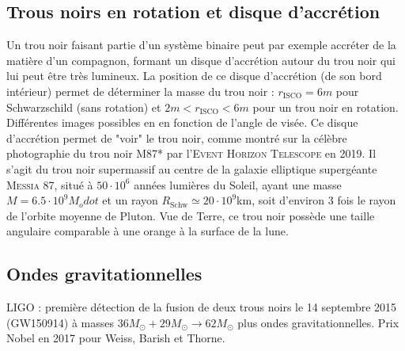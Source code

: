 \subsection{Trous noirs en rotation et disque d'accrétion}
Un trou noir faisant partie d'un système binaire peut par exemple accréter de la matière d'un compagnon, formant un disque d'accrétion autour du trou noir qui lui peut être très lumineux. La position de ce disque d'accrétion (de son bord intérieur) permet de déterminer la masse du trou noir : $r_\text{ISCO} = 6m$ pour Schwarzschild (sans rotation) et $2m<r_\text{ISCO}<6m$ pour un trou noir en rotation. \\
Différentes images possibles en en fonction de l'angle de visée. Ce disque d'accrétion permet de "voir" le trou noir, comme montré sur la célèbre photographie du trou noir \textsc{M87*} par l'\textsc{Event Horizon Telescope} en 2019. Il s'agit du trou noir supermassif au centre de la galaxie elliptique supergéante \textsc{Messia 87}, situé à $50 \cdot 10^6$ années lumières du Soleil, ayant une masse $M = 6.5 \cdot 10^9 M_odot$ et un rayon $R_\text{Schw} \simeq 20 \cdot 10^9$km, soit d'environ 3 fois le rayon de l'orbite moyenne de Pluton. Vue de Terre, ce trou noir possède une taille angulaire comparable à une orange à la surface de la lune.
\subsection{Ondes gravitationnelles}
LIGO : première détection de la fusion de deux trous noirs le 14 septembre 2015 (\textsc{GW150914}) à masses $36 M_\odot + 29M_\odot \to 62 M_\odot$ plus ondes gravitationnelles. Prix Nobel en 2017 pour Weiss, Barish et Thorne.
